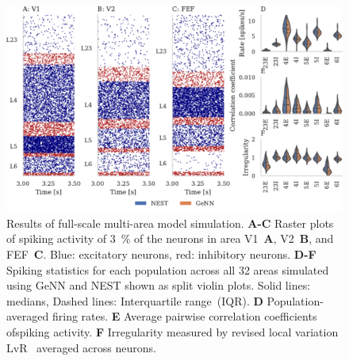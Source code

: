 \documentclass[9pt,twocolumn,twoside,lineno]{pnas-new}
\begin{document}
\begin{figure}
    \centering
    \includegraphics{figures/multi_area}
    \caption{Results of full-scale multi-area model simulation. 
    \textbf{A-C} Raster plots of spiking activity of \SI{3}{\percent} of the neurons in area V1~\textbf{A}, V2~\textbf{B}, and FEF~\textbf{C}. 
    Blue: excitatory neurons, red: inhibitory neurons.
    \textbf{D-F} Spiking statistics for each population across all 32 areas simulated using GeNN and NEST shown as split violin plots.
    Solid lines: medians, Dashed lines: Interquartile range~(IQR).
    \textbf{D} Population-averaged firing rates.
    \textbf{E} Average pairwise correlation coefficients ofspiking activity. 
    \textbf{F} Irregularity measured by revised local variation LvR~\citep{Shinomoto2009} averaged across neurons.}
    \label{fig:multi_area}
\end{figure}
\end{document}

